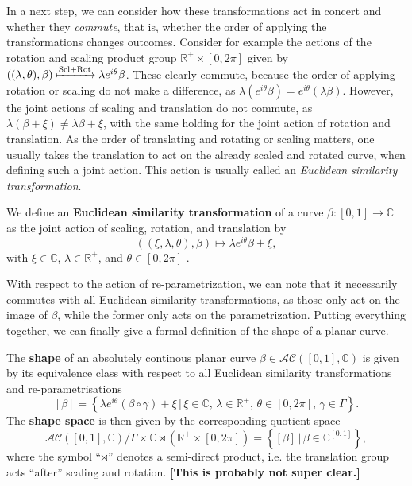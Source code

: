 In a next step, we can consider how these transformations act in concert and whether they \textit{commute}, that is, whether the order of applying the transformations changes outcomes.
Consider for example the actions of the rotation and scaling product group $\mathbb{R}^+ \times [0,2\pi]$ given by $((\lambda, \theta), \beta) \xmapsto{\text{Scl} + \text{Rot}} \lambda e^{i\theta} \beta$.
These clearly commute, because the order of applying rotation or scaling do not make a difference, as $\lambda(e^{i\theta}\beta) = e^{i\theta}(\lambda\beta)$.
However, the joint actions of scaling and translation do not commute, as $\lambda(\beta + \xi) \neq \lambda\beta + \xi$, with the same holding for the joint action of rotation and translation.
As the order of translating and rotating or scaling matters, one usually takes the translation to act on the already scaled and rotated curve, when defining such a joint action.
This action is usually called an \textit{Euclidean similarity transformation}.

\begin{definition} 
  We define an \textbf{Euclidean similarity transformation} of a curve $\beta : [0,1] \rightarrow \mathbb{C}$ as the joint action of scaling, rotation, and translation by 
  $$((\xi, \lambda, \theta), \beta) \mapsto \lambda e^{i\theta} \beta + \xi,$$
  with $\xi \in \mathbb{C}$, $\lambda \in \mathbb{R}^+$, and $\theta \in [0,2\pi]$ \parencite[see][62]{DrydenMardia2016}.
\end{definition}

\noindent With respect to the action of re-parametrization, we can note that it necessarily commutes with all Euclidean similarity transformations, as those only act on the image of $\beta$, while the former only acts on the parametrization.
Putting everything together, we can finally give a formal definition of the shape of a planar curve.

\begin{definition}[Shape]
  The \textbf{shape} of an absolutely continous planar curve $\beta \in \mathcal{AC}([0,1], \mathbb{C})$ is given by its equivalence class with respect to all Euclidean similarity transformations and re-parametrisations
  $$ [\beta] = \left\{\lambda e^{i\theta}(\beta \circ \gamma) + \xi\,|\, \xi \in \mathbb{C},\, \lambda \in \mathbb{R}^+,\, \theta \in [0,2\pi],\, \gamma \in \Gamma\right\}. $$
  The \textbf{shape space} is then given by the corresponding quotient space 
  $$\mathcal{AC}([0,1], \mathbb{C}) \big/ \Gamma \times \mathbb{C} \rtimes \left( \mathbb{R}^+ \times [0,2\pi] \right) = \left\{[\beta]\,|\,\beta \in \mathbb{C}^{[0,1]}\right\},$$
  where the symbol \enquote{$\rtimes$} denotes a semi-direct product, i.e. the translation group acts \enquote{after} scaling and rotation. 
  \textbf{[This is probably not super clear.]}
\end{definition}


